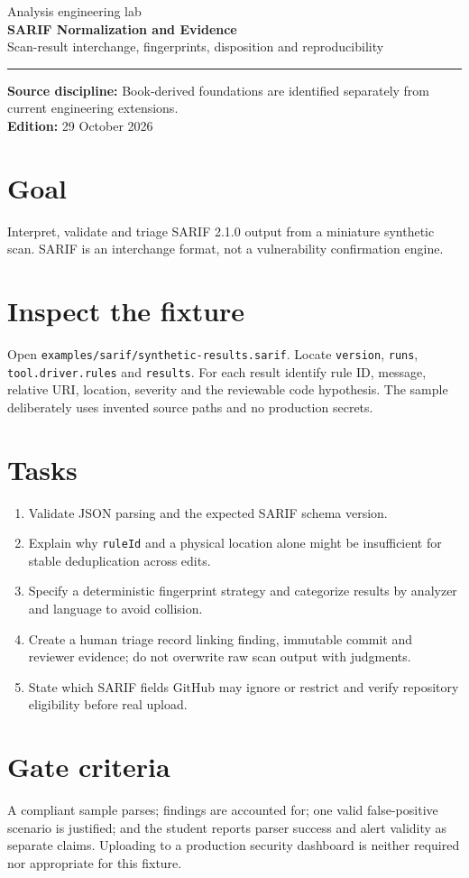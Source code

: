 \documentclass[10pt,letterpaper]{article}
\begin{document}
\hypersetup{pageanchor=false}%
\begin{titlepage}
\vspace*{1.0in}
{\color{bluegray}\Large Analysis engineering lab}\\[1.0em]
{\color{navy}\Huge\bfseries SARIF Normalization and Evidence}\\[0.7em]
{\Large Scan-result interchange, fingerprints, disposition and reproducibility}\\[2.0em]
\rule{\linewidth}{1.0pt}
\vfill
\textbf{Source discipline:} Book-derived foundations are identified separately from current engineering extensions.\\
\textbf{Edition:} 29 October 2026
\end{titlepage}\hypersetup{pageanchor=true}
\tableofcontents
\clearpage
\section{Goal}
Interpret, validate and triage SARIF 2.1.0 output from a miniature synthetic scan. SARIF is an interchange format, not a vulnerability confirmation engine.
\section{Inspect the fixture}
Open \texttt{examples/sarif/synthetic-results.sarif}. Locate \texttt{version}, \texttt{runs}, \texttt{tool.driver.rules} and \texttt{results}. For each result identify rule ID, message, relative URI, location, severity and the reviewable code hypothesis. The sample deliberately uses invented source paths and no production secrets.
\section{Tasks}
\begin{enumerate}
\item Validate JSON parsing and the expected SARIF schema version.
\item Explain why \texttt{ruleId} and a physical location alone might be insufficient for stable deduplication across edits.
\item Specify a deterministic fingerprint strategy and categorize results by analyzer and language to avoid collision.
\item Create a human triage record linking finding, immutable commit and reviewer evidence; do not overwrite raw scan output with judgments.
\item State which SARIF fields GitHub may ignore or restrict and verify repository eligibility before real upload.
\end{enumerate}
\section{Gate criteria}
A compliant sample parses; findings are accounted for; one valid false-positive scenario is justified; and the student reports parser success and alert validity as separate claims. Uploading to a production security dashboard is neither required nor appropriate for this fixture.
\end{document}
